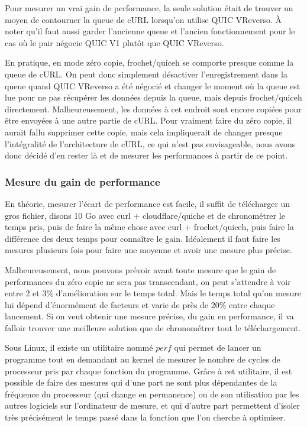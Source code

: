 Pour mesurer un vrai gain de performance, la seule solution était de trouver un moyen de contourner la queue de cURL lorsqu'on utilise QUIC VReverso. À noter qu'il faut aussi garder l'ancienne queue et l'ancien fonctionnement pour le cas où le pair négocie QUIC V1 plutôt que QUIC VReverso.

En pratique, en mode zéro copie, frochet/quiceh se comporte presque comme la queue de cURL. On peut donc simplement désactiver l'enregistrement dans la queue quand QUIC VReverso a été négocié et changer le moment où la queue est lue pour ne pas récupérer les données depuis la queue, mais depuis frochet/quiceh directement.
Malheureusement, les données à cet endroit sont encore copiées pour être envoyées à une autre partie de cURL. Pour vraiment faire du zéro copie, il aurait fallu supprimer cette copie, mais cela impliquerait de changer presque l'intégralité de l'architecture de cURL, ce qui n'est pas envisageable, nous avons donc décidé d'en rester là et de mesurer les performances à partir de ce point.

\subsubsection{Mesure du gain de performance}

En théorie, mesurer l'écart de performance est facile, il suffit de télécharger un gros fichier, disons 10 Go avec curl + cloudflare/quiche et de chronométrer le temps pris, puis de faire la même chose avec curl + frochet/quiceh, puis faire la différence des deux temps pour connaître le gain. Idéalement il faut faire les mesures plusieurs fois pour faire une moyenne et avoir une mesure plus précise.

Malheureusement, nous pouvons prévoir avant toute mesure que le gain de performances du zéro copie ne sera pas transcendant, on peut s'attendre à voir entre 2 et 3\% d'amélioration sur le temps total. Mais le temps total qu'on mesure lui dépend d'énormément de facteurs et varie de près de 20\% entre chaque lancement.
Si on veut obtenir une mesure précise, du gain en performance, il va falloir trouver une meilleure solution que de chronométrer tout le téléchargement.

\vspace{0.5cm}

Sous Linux, il existe un utilitaire nommé $perf$ qui permet de lancer un programme tout en demandant au kernel de mesurer le nombre de cycles de processeur pris par chaque fonction du programme.
Grâce à cet utilitaire, il est possible de faire des mesures qui d'une part ne sont plus dépendantes de la fréquence du processeur (qui change en permanence) ou de son utilisation par les autres logiciels sur l'ordinateur de mesure, et qui d'autre part permettent d'isoler très précisément le temps passé dans la fonction que l'on cherche à optimiser.

